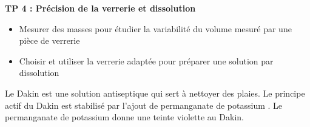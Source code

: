 
\renewcommand{\thesubsection}{\textcolor{red}{\Roman{section}.\arabic{subsection}}}
\renewcommand{\thesubsubsection}{\textcolor{red}{\Roman{section}.\arabic{subsection}.\alph{subsubsection}}}

\setcounter{section}{0}
\setcounter{document}{0}
\sndEnTeteTPQuatre

\begin{center}
\begin{mdframed}[style=titr, leftmargin=60pt, rightmargin=60pt, innertopmargin=7pt, innerbottommargin=7pt, innerrightmargin=8pt, innerleftmargin=8pt]

\begin{center}
\large{\textbf{TP 4 : Précision de la verrerie et dissolution}}
\end{center}

\end{mdframed}
\end{center}


\begin{tcolorbox}[colback=blue!5!white,colframe=blue!75!black,title=Objectifs de la séance :]
\begin{itemize}
    \item Mesurer des masses pour étudier la variabilité du volume mesuré par une pièce de verrerie
  \item Choisir et utiliser la verrerie adaptée pour préparer une solution par dissolution
\end{itemize}
\end{tcolorbox}


\begin{tcolorbox}[colback=orange!5!white,colframe=orange!75!black,title= Scénario:]
Le Dakin est une solution antiseptique qui sert à nettoyer des plaies. Le principe actif du Dakin est stabilisé par l'ajout de permanganate de potassium . Le permanganate de potassium donne une teinte violette au Dakin.
\end{tcolorbox}





